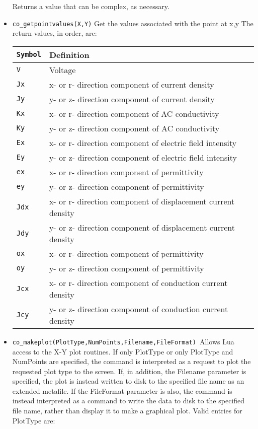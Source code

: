 \begin{itemize}
Returns a value that can be complex, as necessary.

\item \texttt{co\_getpointvalues(X,Y)} Get the values associated with the point at x,y
The return values, in order, are:

\begin{tabular}{ll}
\texttt{Symbol} &  Definition \\ \hline
\texttt{V} & Voltage \\
\texttt{Jx} & x- or r- direction component of current density \\
\texttt{Jy} & y- or z- direction component of current density \\
\texttt{Kx} & x- or r- direction component of AC conductivity \\
\texttt{Ky} & y- or z- direction component of AC conductivity \\
\texttt{Ex} & x- or r- direction component of electric field intensity \\
\texttt{Ey} & y- or z- direction component of electric field intensity \\
\texttt{ex} & x- or r- direction component of permittivity \\
\texttt{ey} & y- or z- direction component of permittivity \\
\texttt{Jdx} & x- or r- direction component of displacement current density \\
\texttt{Jdy} & y- or z- direction component of displacement current density \\
\texttt{ox} & x- or r- direction component of permittivity \\
\texttt{oy} & y- or z- direction component of permittivity \\
\texttt{Jcx} & x- or r- direction component of conduction current density \\
\texttt{Jcy} & y- or z- direction component of conduction current density \\
\end{tabular}

\item \texttt{co\_makeplot(PlotType,NumPoints,Filename,FileFormat) }Allows Lua access
to the X-Y plot routines. If only PlotType or only PlotType and NumPoints
are specified, the command is interpreted as a request to plot the requested
plot type to the screen. If, in addition, the Filename parameter is
specified, the plot is instead written to disk to the specified file name as
an extended metafile. If the FileFormat parameter is also, the command is
instead interpreted as a command to write the data to disk to the specified
file name, rather than display it to make a graphical plot. Valid entries
for PlotType are:


\end{itemize}
